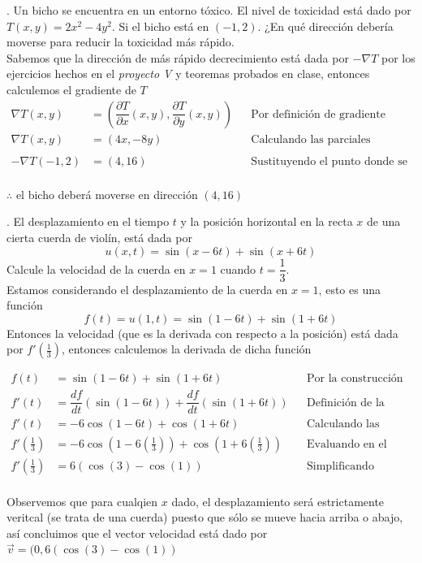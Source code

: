 \documentclass[letterpaper]{article}
\renewcommand{\d}{\partial}
\renewcommand{\*}{\cdot}
\theoremstyle{definition}
\begin{document}
. Un bicho se encuentra en un entorno tóxico. El nivel de toxicidad está dado por $ T(x,y) = 2x^2 - 4y^2 $. Si el bicho está en $ (-1,2) $. ¿En qué dirección debería moverse para reducir la toxicidad más rápido.\\

Sabemos que la dirección de más rápido decrecimiento está dada por $ - \nabla T $ por los ejercicios hechos en el \textit{proyecto V} y teoremas probados en clase, entonces calculemos el gradiente de $ T $
\begin{align*}
	\nabla T (x,y) &= \left( \dfrac{\d T}{\d x}(x,y),\dfrac{\d T}{\d y}(x,y)  \right) &&\text{Por definición de gradiente}\\
	\nabla T (x,y) &= \left( 4x,-8y  \right) &&\text{Calculando las parciales}\\
	\\
	-\nabla T (-1,2) &= (4,16) &&\text{Sustituyendo el punto donde se encuentra el bicho}\\
\end{align*}
\begin{center}
	$ \therefore $ el bicho deberá moverse en dirección $ (4,16)$
\end{center}

. El desplazamiento en el tiempo $ t $ y la posición horizontal en la recta $ x $ de una cierta cuerda de violín, está dada por $$ u(x,t) = \sin(x - 6t) + \sin(x+6t) $$ Calcule la velocidad de la cuerda en $ x = 1 $ cuando $ t = \dfrac{1}{3} $.\\
Estamos considerando el desplazamiento de la cuerda en $ x = 1 $, esto es una función 
\[ f(t) = u(1,t) = \sin(1-6t) + \sin(1 + 6t) \]
Entonces la velocidad (que es la derivada con respecto a la posición) está dada por $ f'(\frac{1}{3}) $, entonces calculemos la derivada de dicha función

\begin{align*}
	f(t) &= \sin(1-6t) + \sin(1 + 6t) && \text{Por la construcción de dicha función respecto al tiempo}\\
	f'(t) &= \dfrac{df}{dt}(\sin(1-6t)) + \dfrac{df}{dt}(\sin(1 + 6t)) && \text{Definición de la derivada}\\
	f'(t) &= -6\cos(1-6t) + \cos(1 + 6t) && \text{Calculando las derivadas}\\
	f'\left(\frac{1}{3}\right) &= -6\cos(1-6\left(\frac{1}{3}\right)) + \cos(1 + 6\left(\frac{1}{3}\right)) && \text{Evaluando en el tiempo dado}\\
	f'\left(\frac{1}{3}\right) &= 6(\cos(3)- \cos(1)) && \text{Simplificando (factorizando y usando la paridad del coseno)}\\
\end{align*}
\begin{center}
	Observemos que para cualqien $ x $ dado, el desplazamiento será estrictamente veritcal (se trata de una cuerda) puesto que sólo se mueve hacia arriba o abajo, así concluimos que el vector velocidad está dado por $ \vec{v} = (0,6(\cos(3) - \cos(1)) $
\end{center}
\end{document}
